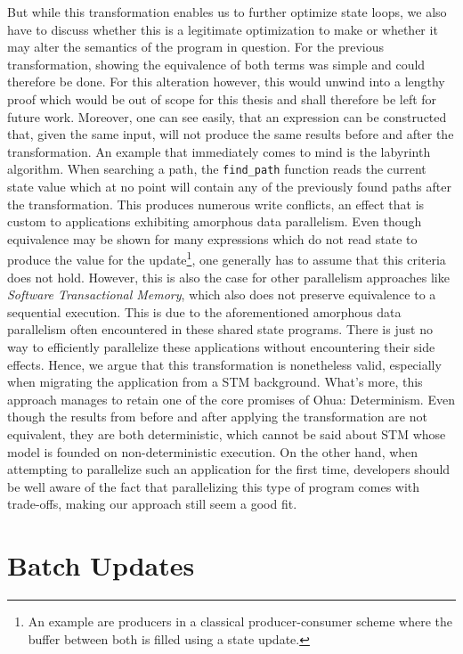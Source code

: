 But while this transformation enables us to further optimize state loops, we also have to discuss whether this is a legitimate optimization to make or whether it may alter the semantics of the program in question.
For the previous transformation, showing the equivalence of both terms was simple and could therefore be done.
For this alteration however, this would unwind into a lengthy proof which would be out of scope for this thesis and shall therefore be left for future work.
Moreover, one can see easily, that an expression can be constructed that, given the same input, will not produce the same results before and after the transformation.
An example that immediately comes to mind is the labyrinth algorithm.
When searching a path, the \texttt{find\_path} function reads the current state value which at no point will contain any of the previously found paths after the transformation.
This produces numerous write conflicts, an effect that is custom to applications exhibiting amorphous data parallelism.
Even though equivalence may be shown for many expressions which do not read state to produce the value for the update\footnote{An example are producers in a classical producer-consumer scheme where the buffer between both is filled using a state update.}, one generally has to assume that this criteria does not hold.
However, this is also the case for other parallelism approaches like \emph{Software Transactional Memory}, which also does not preserve equivalence to a sequential execution.
This is due to the aforementioned amorphous data parallelism often encountered in these shared state programs.
There is just no way to efficiently parallelize these applications without encountering their side effects.
Hence, we argue that this transformation is nonetheless valid, especially when migrating the application from a STM background.
What's more, this approach manages to retain one of the core promises of Ohua: Determinism.
Even though the results from before and after applying the transformation are not equivalent, they are both deterministic, which cannot be said about STM whose model is founded on non-deterministic execution.
On the other hand, when attempting to parallelize such an application for the first time, developers should be well aware of the fact that parallelizing this type of program comes with trade-offs, making our approach still seem a good fit.

\section{Batch Updates}%
\label{sec:transformations:tf2}

